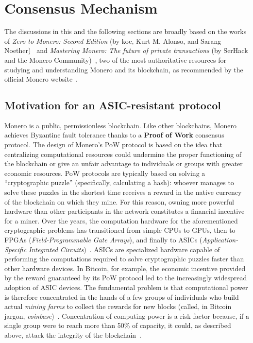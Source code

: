 \documentclass[conference]{IEEEtran}
\begin{document}

\section{Consensus Mechanism}
The discussions in this and the following sections are broadly based on the works of \emph{Zero to Monero: Second Edition} (by koe, Kurt M. Alonso, and Sarang Noether)~\cite{zero_to_monero_2} and \emph{Mastering Monero: The future of private transactions} (by SerHack and the Monero Community)~\cite{mastering_monero}, two of the most authoritative resources for studying and understanding Monero and its blockchain, as recommended by the official Monero website~\cite{monero_library}.

\subsection{Motivation for an ASIC-resistant protocol}
Monero is a public, permissionless blockchain. Like other blockchains, Monero achieves Byzantine fault tolerance thanks to a \textbf{Proof of Work} consensus protocol. The design of Monero's PoW protocol is based on the idea that centralizing computational resources could undermine the proper functioning of the blockchain or give an unfair advantage to individuals or groups with greater economic resources. PoW protocols are typically based on solving a ``cryptographic puzzle'' (specifically, calculating a hash): whoever manages to solve these puzzles in the shortest time receives a reward in the native currency of the blockchain on which they mine. For this reason, owning more powerful hardware than other participants in the network constitutes a financial incentive for a miner. Over the years, the computation hardware for the aforementioned cryptographic problems has transitioned from simple CPUs to GPUs, then to FPGAs (\textit{Field-Programmable Gate Arrays}), and finally to ASICs (\textit{Application-Specific Integrated Circuits})~\cite{bitcoin_asics_dominance}. ASICs are specialized hardware capable of performing the computations required to solve cryptographic puzzles faster than other hardware devices. In Bitcoin, for example, the economic incentive provided by the reward guaranteed by its PoW protocol led to the increasingly widespread adoption of ASIC devices. The fundamental problem is that computational power is therefore concentrated in the hands of a few groups of individuals who build actual \textit{mining farms} to collect the rewards for new blocks (called, in Bitcoin jargon, \textit{coinbase})~\cite{bitcoin_asics_dominance}. Concentration of computing power is a risk factor because, if a single group were to reach more than 50\% of capacity, it could, as described above, attack the integrity of the blockchain~\cite{attack_51}.\\
\end{document}
